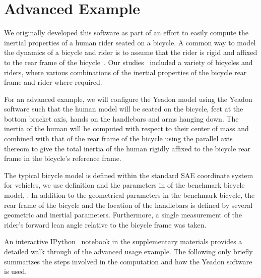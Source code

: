 \documentclass[10pt]{article}
\begin{document}
\section*{Advanced Example}
\label{sec:advanced-example}

We originally developed this software as part of an effort to easily compute
the inertial properties of a human rider seated on a bicycle. A common way to
model the dynamics of a bicycle and rider is to assume that the rider is rigid
and affixed to the rear frame of the bicycle~\cite{Meijaard2007}. Our
studies~\cite{Moore2012} included a variety of bicycles and riders, where
various combinations of the inertial properties of the bicycle rear frame and
rider where required.

For an advanced example, we will configure the Yeadon model using the Yeadon
software such that the human model will be seated on the bicycle, feet at the
bottom bracket axis, hands on the handlebars and arms hanging down. The inertia
of the human will be computed with respect to their center of mass and combined
with that of the rear frame of the bicycle using the parallel axis thereom to
give the total inertia of the human rigidly affixed to the bicycle rear frame
in the bicycle's reference frame.

The typical bicycle model is defined within the standard SAE coordinate system
for vehicles, we use definition and the parameters in of the benchmark bicycle
model, \cite{Meijaard2007}. In addition to the geometrical parameters in the
benchmark bicycle, the rear frame of the bicycle and the location of the
handlebars is defined by several geometric and inertial parameters.
Furthermore, a single measurement of the rider's forward lean angle relative to
the bicycle frame was taken.

An interactive IPython~\cite{Perez2007} notebook in the supplementary materials
provides a detailed walk through of the advanced usage example. The following
only briefly summarizes the steps involved in the computation and how the
Yeadon software is used.
\end{document}
